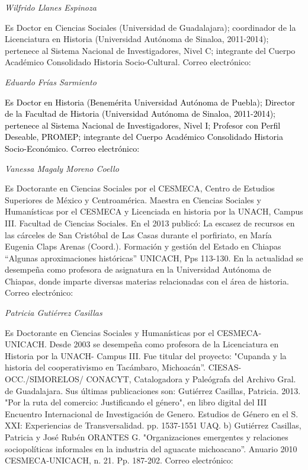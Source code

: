 { 
\textit{Wilfrido Llanes Espinoza}}

{ 
Es Doctor en Ciencias Sociales (Universidad de Guadalajara); coordinador de
la Licenciatura en Historia (Universidad Autónoma de Sinaloa, 2011-2014);
pertenece al Sistema Nacional de Investigadores,  Nivel C;  integrante del
Cuerpo Académico Consolidado Historia Socio-Cultural. Correo electrónico:
\href{mailto:wllanes@gmail.com}{}}


\bigskip

{ 
\textit{Eduardo Frías Sarmiento}}

{ 
\textcolor{black}{Es Doctor en Historia (Benemérita Universidad Autónoma de
Puebla); Director de la Facultad de Historia (Universidad Autónoma de
Sinaloa, 2011-2014); pertenece al Sistema Nacional de Investigadores, 
Nivel I;  Profesor con Perfil Deseable, PROMEP; integrante del Cuerpo
Académico Consolidado Historia Socio-Económico. Correo
electrónico:}\textit{\textcolor{black}{
}}\href{mailto:eduardofrias@uas.edu.mx}{}}


\bigskip


\bigskip

\textit{Vanessa Magaly Moreno Coello} 

Es Doctorante en Ciencias Sociales por el CESMECA, Centro de Estudios
Superiores de México y Centroamérica. Maestra en Ciencias Sociales y
Humanísticas por el CESMECA y Licenciada en historia por la UNACH, Campus
III. Facultad de Ciencias Sociales. En el 2013 publicó: La escasez de
recursos en las cárceles de San Cristóbal de Las Casas durante el
porfiriato, en María Eugenia Claps Arenas (Coord.). Formación y gestión del
Estado en Chiapas “Algunas aproximaciones históricas” UNICACH, Pps 113-130.
En la actualidad se desempeña como profesora de asignatura en la
Universidad Autónoma de Chiapas, donde imparte diversas materias
relacionadas con el área de historia. Correo electrónico:
\href{mailto:vagmo18@hotmail.com}{}


\bigskip

\textit{Patricia Gutiérrez Casillas }

Es Doctorante en Ciencias Sociales y Humanísticas por el CESMECA- UNICACH.
Desde 2003 se desempeña como profesora de la Licenciatura en Historia por
la UNACH- Campus III. Fue titular del proyecto: "Cupanda y la historia del
cooperativismo en Tacámbaro, Michoacán”. CIESAS-OCC./SIMORELOS/ CONACYT,
Catalogadora y Paleógrafa del Archivo Gral. de Guadalajara. Sus últimas
publicaciones son: Gutiérrez Casillas, Patricia. 2013. "Por la ruta del
comercio: Justificando el género", en libro digital del III Encuentro
Internacional de Investigación de Genero. Estudios de Género en el S. XXI:
Experiencias de Transversalidad. pp. 1537-1551 UAQ. b) Gutiérrez Casillas,
Patricia y José Rubén ORANTES G. "Organizaciones emergentes y relaciones
sociopolíticas informales en la industria del aguacate michoacano”. Anuario
2010 CESMECA-UNICACH, n. 21. Pp. 187-202. Correo electrónico:
\href{mailto:paty_gutierrez05@hotmail.com}{}


